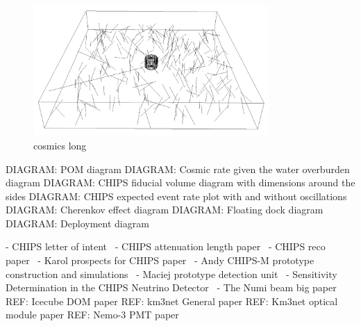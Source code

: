 \begin{figure} %
    \includegraphics[width=0.8\textwidth]{diagrams/5-chips/cosmics.png}
    \caption[cosmics short]
    {cosmics long}
    \label{fig:cosmics}
\end{figure} %

DIAGRAM: POM diagram
DIAGRAM: Cosmic rate given the water overburden diagram
DIAGRAM: CHIPS fiducial volume diagram with dimensions around the sides
DIAGRAM: CHIPS expected event rate plot with and without oscillations
DIAGRAM: Cherenkov effect diagram
DIAGRAM: Floating dock diagram
DIAGRAM: Deployment diagram

- CHIPS letter of intent~\cite{adamson2013}
- CHIPS attenuation length paper~\cite{amat2017}
- CHIPS reco paper~\cite{blake2016}
- Karol prospects for CHIPS paper~\cite{lang2015}
- Andy CHIPS-M prototype construction and simulations~\cite{perch2015}
- Maciej prototype detection unit~\cite{pfutznerProto2017}
- Sensitivity Determination in the CHIPS Neutrino Detector~\cite{adde2016}
- The Numi beam big paper~\cite{adamson2016}
REF: Icecube DOM paper
REF: km3net General paper
REF: Km3net optical module paper
REF: Nemo-3 PMT paper